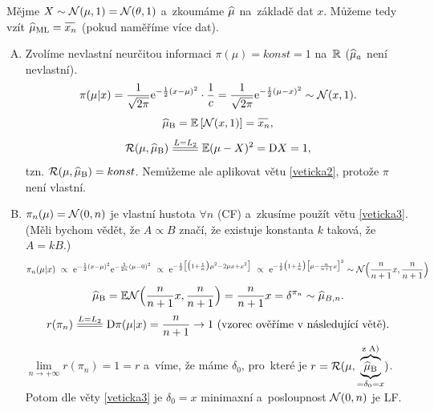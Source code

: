 \begin{example}
	Mějme $X\sim\mathcal{N}(\mu,1)=\mathcal{N}(\theta,1)$ a~zkoumáme $\widehat{\mu}$ na~základě dat $x$. Můžeme tedy vzít $\widehat{\mu}_{\mathrm{ML}}=\oxnn$ (pokud naměříme více dat).
	\begin{enumerate}[A)]
		\item Zvolíme nevlastní neurčitou informaci $\pi(\mu)=konst=1$ na~$\mathbb{R}$ ($\widehat{\mu}_a$ není nevlastní). $$\pi(\mu|x)=\frac{1}{\sqrt{2\pi}}\mathrm{e}^{-\frac{1}{2}(x-\mu)^2}\cdot \frac{1}{c}=\frac{1}{\sqrt{2\pi}}\mathrm{e}^{-\frac{1}{2}(\mu-x)^2}\sim\mathcal{N}(x,1).$$
		$$\widehat{\mu}_\mathrm{B}=\EE{\NN(x,1)}=\oxnn,$$
		$$ \RF(\mu,\widehat{\mu}_\mathrm{B})\equal{L=L_2}\E(\mu-X)^2=\D X=1,$$ tzn. $\mathcal{R}(\mu,\widehat{\mu}_\mathrm{B})=konst$. Nemůžeme ale aplikovat větu \ref{veticka2}, protože $\pi$ není vlastní.
		\item $\pi_n(\mu)=\mathcal{N}(0,n)$ je vlastní hustota $\forall n$ (CF) a~zkusíme použít větu \ref{veticka3}. (Měli bychom vědět, že $A \propto B$ značí, že existuje konstanta $k$ taková, že $A=kB$.)
		\[
		\begin{split}
		\pi_n(\mu|x)~\propto~ \mathrm{e}^{-\frac{1}{2}(x-\mu)^2}\mathrm{e}^{-\frac{1}{2n}(\mu-0)^2}~\propto~\mathrm{e}^{-\frac{1}{2}\big[\big(1+\frac{1}{n}\big)\mu^2-2\mu x+x^2\big]}~\propto~\mathrm{e}^{-\frac{1}{2}\big(1+\frac{1}{n}\big)\big[\mu-\frac{n}{n+1}x\big]^2}\sim \mathcal{N}\Big(\frac{n}{n+1}x,\frac{n}{n+1}\Big)
		\end{split}
		\]
		$$\widehat{\mu}_\mathrm{B}=\mathbb{E} \mathcal{N}\Big(\frac{n}{n+1}x,\frac{n}{n+1}\Big)=\frac{n}{n+1}x=\delta^{\pi_n}\sim\widehat{\mu}_{B,n}.$$
		$$r(\pi_n)\equal{L=L_2}\D \pi(\mu|x)=\frac{n}{n+1}\to1 \text{ (vzorec ověříme v~následující větě)}.$$
		$\lim\limits_{n\to+\infty}r(\pi_n)=1=r$ a~víme, že máme $\delta_0$, pro~které je $r=\mathcal{R}(\mu,\underbrace{\overbrace{\widehat{\mu}_\mathrm{B}}^{\text{z A)}}}_{=\delta_0=x})$. Potom dle věty \ref{veticka3} je $\delta_0=x$ minimaxní a~posloupnost $\mathcal{N}(0,n)$ je LF.
	\end{enumerate}
\end{example}

